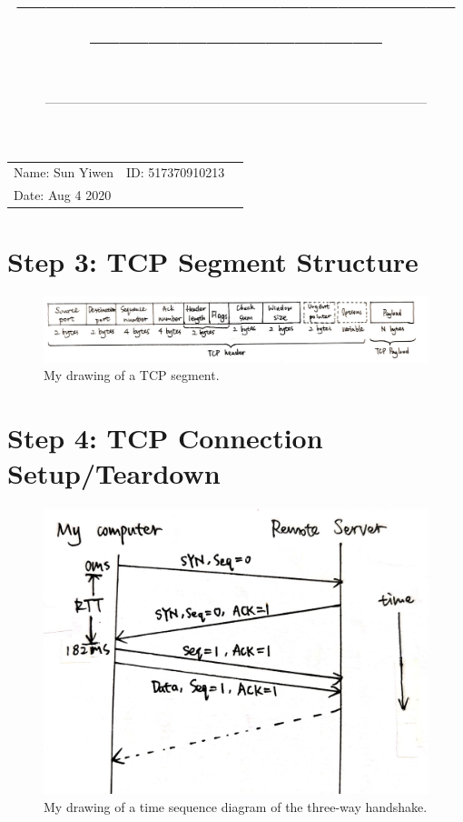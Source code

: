 \documentclass[a4paper]{article}
\title{—————————————————————————\\ \sc{UM-SJTU Joint Institute}}
\author{\sc{Computer Networks}}
\date{\sc{(Ve489)}\\——————————————————————————————}
\begin{document}
\maketitle
\vspace{5cm}
\centerline{\Large{}}
\vspace{9cm}
\begin{tabular}{lll}
\qquad \qquad Name: Sun Yiwen&ID: 517370910213\\
\qquad \qquad Date: Aug 4 2020
\end{tabular}

\newpage
\section{Step 3: TCP Segment Structure}
\begin{figure}[htbp]
\centering
\includegraphics[scale=0.15]{1.jpg}
\caption{My drawing of a TCP segment.}
\end{figure}
\section{Step 4: TCP Connection Setup/Teardown}
\begin{figure}[htbp]
\centering
\includegraphics[scale=0.1]{2.jpg}
\caption{My drawing of a time sequence diagram of the three-way handshake.}
\end{figure}
\end{document}
